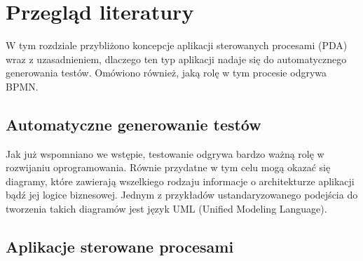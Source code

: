 \newpage %
\section{Przegląd literatury}
W tym rozdziale przybliżono koncepcje aplikacji sterowanych procesami (PDA) wraz z uzasadnieniem, dlaczego ten typ aplikacji nadaje się do automatycznego generowania testów. Omówiono również, jaką rolę w tym procesie odgrywa BPMN. 

\subsection{Automatyczne generowanie testów}
Jak już wspomniano we wstępie, testowanie odgrywa bardzo ważną rolę w rozwijaniu oprogramowania. Równie przydatne w tym celu mogą okazać się diagramy, które zawierają wszelkiego rodzaju informacje o architekturze aplikacji bądź jej logice biznesowej. Jednym z przykładów ustandaryzowanego podejścia do tworzenia takich diagramów jest język UML (Unified Modeling Language)\cite{uml_spec}. 


\subsection{Aplikacje sterowane procesami}

